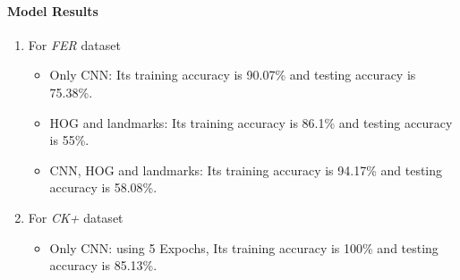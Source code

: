 \paragraph{Model Results}
\begin{enumerate}
\item For \textit{FER} dataset \newline
\begin{itemize}[noitemsep,nolistsep]
    \item Only CNN: Its training accuracy is 90.07\% and testing accuracy is 75.38\%.

    \item HOG and landmarks: Its training accuracy is 86.1\% and testing accuracy is 55\%.
    \item CNN, HOG and landmarks: Its training accuracy is 94.17\% and testing accuracy is 58.08\%.
\end{itemize}

\item For \textit{CK+} dataset \newline
\begin{itemize}[noitemsep,nolistsep]
    \item Only CNN: using 5 Expochs, Its training accuracy is 100\% and testing accuracy is 85.13\%.


\end{itemize}
\end{enumerate}
